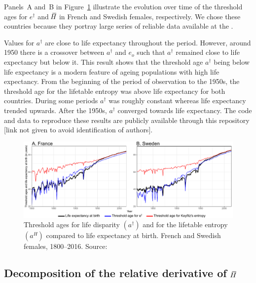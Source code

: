 \documentclass[a4paper,twoside, openright, 12pt, leqno]{article}
\newcommand*\xbar[1]{%
   \hbox{%
     \vbox{%
       \hrule height 0.5pt %
       \kern0.3ex%
       \hbox{%
         \kern-0.28em%
         \ensuremath{#1}%
         \kern-0.05em%
       }%
     }%
   }%
}
\begin{document}
Panels~A and~B in Figure~\ref{fig:Fig2} illustrate the evolution over time of the threshold ages for $e^\dagger$ and $\,\xbar{H}$ in French and Swedish females, respectively. We chose these countries because they portray large series of reliable data available at the \cite{HMD}. 

Values for $a^\dagger$ are close to life expectancy throughout the period. However, around 1950 there is a crossover between $a^\dagger$ and $e_o$ such that $a^\dagger$ remained close to life expectancy but below it. This result shows that the threshold age $a^\dagger$ being below life expectancy is a modern feature of ageing populations with high life expectancy. From the beginning of the period of observation to the 1950s, the threshold age for the lifetable entropy was above life expectancy for both countries. During some periods $a^\dagger$ was roughly constant whereas life expectancy trended upwards. After the 1950s, $a^\dagger$ converged towards life expectancy. The code and data to reproduce these results are publicly available through this repository [link not given to avoid identification of authors].

\begin{figure}[h]
  \centering
  \includegraphics[scale=.72]{Figures/Threshold_ages}
  \caption{Threshold ages for life disparity $(a^\dagger)$ and for the lifetable entropy $(a^H)$ compared to life expectancy at birth. French and Swedish females, 1800--2016. Source: \cite{HMD}}
  \label{fig:Fig2}
\end{figure}

\FloatBarrier

\subsection{Decomposition of the relative derivative of $\,\xbar{H}$}
\end{document}
